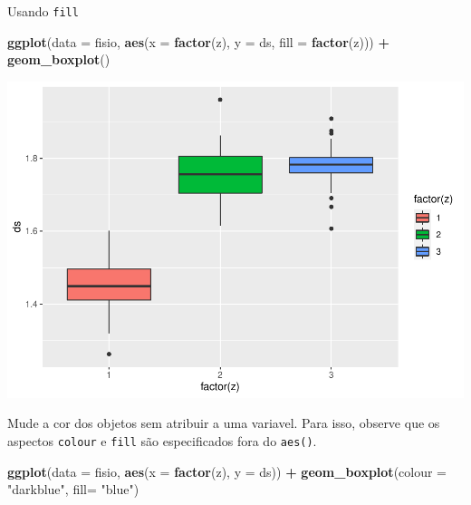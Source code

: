 \documentclass[]{book}
\newenvironment{Shaded}{\begin{snugshade}}{\end{snugshade}}
\newcommand{\DataTypeTok}[1]{\textcolor[rgb]{0.13,0.29,0.53}{#1}}
\newcommand{\KeywordTok}[1]{\textcolor[rgb]{0.13,0.29,0.53}{\textbf{#1}}}
\newcommand{\NormalTok}[1]{#1}
\newcommand{\OperatorTok}[1]{\textcolor[rgb]{0.81,0.36,0.00}{\textbf{#1}}}
\newcommand{\StringTok}[1]{\textcolor[rgb]{0.31,0.60,0.02}{#1}}
\begin{document}
Usando \texttt{fill}

\begin{Shaded}
\begin{Highlighting}[]
\KeywordTok{ggplot}\NormalTok{(}\DataTypeTok{data =}\NormalTok{ fisio, }\KeywordTok{aes}\NormalTok{(}\DataTypeTok{x =} \KeywordTok{factor}\NormalTok{(z), }\DataTypeTok{y =}\NormalTok{ ds, }\DataTypeTok{fill =} \KeywordTok{factor}\NormalTok{(z))) }\OperatorTok{+}
\StringTok{  }\KeywordTok{geom_boxplot}\NormalTok{()}
\end{Highlighting}
\end{Shaded}

\includegraphics{TudodoR_files/figure-latex/unnamed-chunk-201-1.pdf}

Mude a cor dos objetos sem atribuir a uma variavel. Para isso, observe que os aspectos \texttt{colour} e \texttt{fill} são especificados fora do \texttt{aes()}.

\begin{Shaded}
\begin{Highlighting}[]
\KeywordTok{ggplot}\NormalTok{(}\DataTypeTok{data =}\NormalTok{ fisio, }\KeywordTok{aes}\NormalTok{(}\DataTypeTok{x =} \KeywordTok{factor}\NormalTok{(z), }\DataTypeTok{y =}\NormalTok{ ds)) }\OperatorTok{+}
\StringTok{  }\KeywordTok{geom_boxplot}\NormalTok{(}\DataTypeTok{colour =} \StringTok{"darkblue"}\NormalTok{, }\DataTypeTok{fill=} \StringTok{"blue"}\NormalTok{)}
\end{Highlighting}
\end{Shaded}
\end{document}
